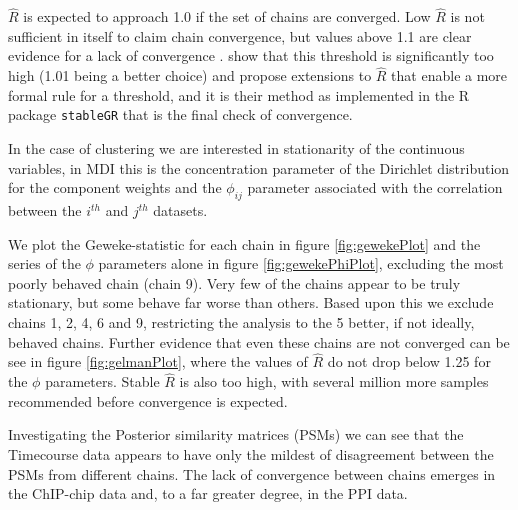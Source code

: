 \documentclass[]{article}
\begin{document}
$\hat{R}$ is expected to approach 1.0 if the set of chains are converged. Low $\hat{R}$ is not sufficient in itself to claim chain convergence, but values above 1.1 are clear evidence for a lack of convergence \citep{gelman2013bayesian}. \cite{vats2018revisiting} show that this threshold is significantly too high (1.01 being a better choice) and propose extensions to $\hat{R}$ that enable a more formal rule for a threshold, and it is their method as implemented in the R package \texttt{stableGR} \citep{knudson20202stableGR} that is the final check of convergence.

In the case of clustering we are interested in stationarity of the continuous variables, in MDI this is the concentration parameter of the Dirichlet distribution for the component weights and the $\phi_{ij}$ parameter associated with the correlation between the $i^{th}$ and $j^{th}$ datasets. 

We plot the Geweke-statistic for each chain in figure \ref{fig:gewekePlot} and the series of the $\phi$ parameters alone in figure \ref{fig:gewekePhiPlot}, excluding the most poorly behaved chain (chain 9). Very few of the chains appear to be truly stationary, but some behave far worse than others. Based upon this we exclude chains 1, 2, 4, 6 and 9, restricting the analysis to the 5 better, if not ideally, behaved chains. Further evidence that even these chains are not converged can be see in figure \ref{fig:gelmanPlot}, where the values of $\hat{R}$ do not drop below 1.25 for the $\phi$ parameters. Stable $\hat{R}$ is also too high, with several million more samples recommended before convergence is expected.

Investigating the Posterior similarity matrices (PSMs) we can see that the Timecourse data appears to have only the mildest of disagreement between the PSMs from different chains. The lack of convergence between chains emerges in the ChIP-chip data and, to a far greater degree, in the PPI data.
\end{document}
